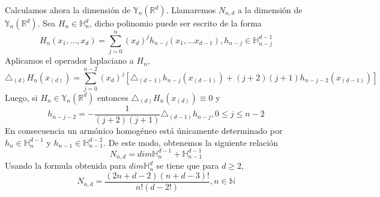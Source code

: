 Calculamos ahora la dimensión de $\mathds{Y}_n(\mathds{R}^d)$. Llamaremos $N_{n,d}$ a la dimensión de $\mathds{Y}_n(\mathds{R}^d)$.
Sea $H_{n}\in\mathds{H}_n^d$, dicho polinomio puede ser escrito de la forma
$$
H_n(x_1,...,x_d) = \sum_{j=0}^{n}(x_d)^jh_{n-j}(x_1,...x_{d-1}),		h_{n-j}\in\mathds{H}_{n-j}^{d-1}
$$
Aplicamos el operador laplaciano a $H_n$,
$$
\triangle_{(d)}H_n(x_{(d)}) = \sum_{j=0}^{n-2}(x_d)^j[\triangle_{(d-1)}h_{n-j}(x_{(d-1)})+(j+2)(j+1)h_{n-j-2}(x_{(d-1)})]
$$
Luego, si $H_n \in \mathds{Y}_n(\mathds{R}^d) $ entonces $\triangle_{(d)}H_n(x_{(d)}) \equiv 0$ y
$$
h_{n-j-2} = -\frac{1}{(j+2)(j+1)}\triangle_{(d-1)}h_{n-j},		0 \le j \le n-2
$$
En consecuencia un armónico homogéneo está únicamente determinado por $h_n \in \mathds{H}_n^{d-1}$ y $h_{n-1} \in \mathds{H}_{n-1}^{d-2}$. De este modo, obtenemos la siguiente relación
$$
N_{n,d} = dim \mathds{H}_n^{d-1}+  \mathds{H}_{n-1}^{d-1}
$$
Usando la formula obtenida para $dim \mathds{H}_n^d$ se tiene que para $d\ge 2$,
$$
N_{n,d} = \frac{(2n+d-2)(n+d-3)!}{n!(d-2!)},	n\in\mathds{N}
$$
